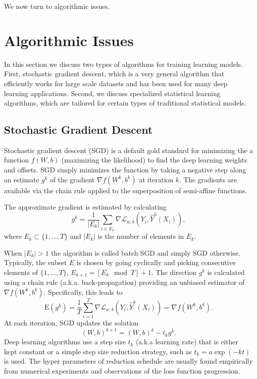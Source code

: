 \documentclass[12pt]{article}
\begin{document}
We now turn to algorithmic issues. 

\section{Algorithmic Issues}\label{sec:algorithms}
In this section we discuss two types of algorithms for training learning models. First, stochastic gradient descent, which is a very general algorithm that efficiently works for large scale datasets and has been used for many deep learning applications. Second, we discuss specialized statistical learning algorithms, which are tailored for certain types of traditional statistical models.  

\subsection{Stochastic Gradient Descent}
Stochastic gradient descent (SGD) is a default gold standard for minimizing
the a function $f(W,b)$ (maximizing the likelihood) to find the deep
learning weights and offsets. SGD simply minimizes the function by
taking a negative step along an estimate $g^k$ of the gradient $\nabla
f(W^k, b^k)$ at iteration $k$. The gradients are available via the
chain rule applied to the superposition of semi-affine functions. 

The
approximate gradient is estimated by calculating
%
\[
g^k = \frac{1}{|E_k|} \sum_{i \in E_k} \nabla\mathcal{L}_{w,b}( Y_i ,
\hat{Y}^k( X_i)),
\]
%
where $E_k \subset\{1,\ldots,T \}$ and $|E_k|$ is the number of
elements in $E_k$.\vadjust{\goodbreak}

When $|E_k| >1$ the algorithm is called batch SGD and simply SGD
otherwise. Typically, the subset $E$ is chosen by going cyclically and
picking consecutive elements of $\{1,\ldots,T \}$, $E_{k+1} = [E_k \mod
T]+1$. The direction $g^k$ is calculated using a chain rule (a.k.a.
back-propagation) providing an unbiased estimator of $\nabla f(W^k,
b^k)$. Specifically, this leads to
%
\[
\mathrm{E}(g^k) = \frac{1}{T} \sum_{i =1}^T \nabla\mathcal{L}_{w,b}(
Y_i , \hat{Y}^k( X_i)) = \nabla f(W^k, b^k).
\]
%
At each iteration,  SGD updates the solution
%
\[
(W,b)^{k+1} = (W,b)^k - t_k g^k.
\]
%
Deep learning algorithms use a step size $t_k$ (a.k.a learning rate) that is either kept constant or a simple step size reduction strategy, such as $t_k = a\exp(-kt)$  is used. The hyper parameters of reduction schedule  are usually found empirically from numerical experiments and observations of the loss function progression. 
\end{document}
